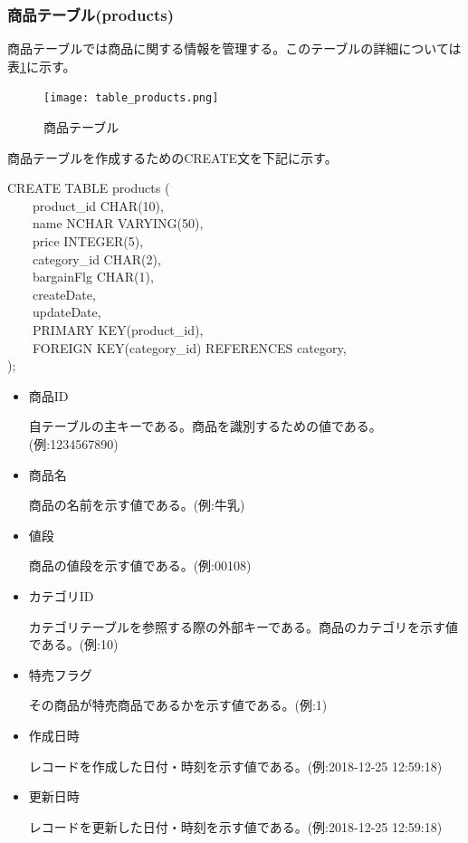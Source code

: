 \documentclass[a4j]{jarticle}
\begin{document}
\subsubsection{商品テーブル(products)}

商品テーブルでは商品に関する情報を管理する。このテーブルの詳細については表\ref{table_products}に示す。

\begin{figure}[H]
  \begin{center}
    \texttt{[image: table\_products.png]} \\
    \caption{商品テーブル}
    \label{table_products}
  \end{center}
\end{figure}

商品テーブルを作成するためのCREATE文を下記に示す。
\begin{screen}
CREATE TABLE products (\\
　　product\_id CHAR(10),\\
　　name NCHAR VARYING(50),\\
　　price INTEGER(5),\\
　　category\_id CHAR(2),\\
　　bargainFlg CHAR(1),\\
　　createDate,\\
　　updateDate,\\
　　PRIMARY KEY(product\_id),\\
　　FOREIGN KEY(category\_id) REFERENCES category,\\
);
\end{screen}
\begin{itemize}
\item 商品ID\par
  自テーブルの主キーである。商品を識別するための値である。(例:1234567890)

\item 商品名\par
  商品の名前を示す値である。(例:牛乳)

\item 値段\par
  商品の値段を示す値である。(例:00108)

\item カテゴリID\par
  カテゴリテーブルを参照する際の外部キーである。商品のカテゴリを示す値である。(例:10)

\item 特売フラグ\par
  その商品が特売商品であるかを示す値である。(例:1)

\item 作成日時\par
  レコードを作成した日付・時刻を示す値である。(例:2018-12-25 12:59:18)

\item 更新日時\par
  レコードを更新した日付・時刻を示す値である。(例:2018-12-25 12:59:18)
\end{itemize}
\end{document}
